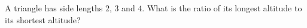 A triangle has side lengths $2$, $3$ and $4$. What is the ratio of its longest altitude to its shortest altitude?

